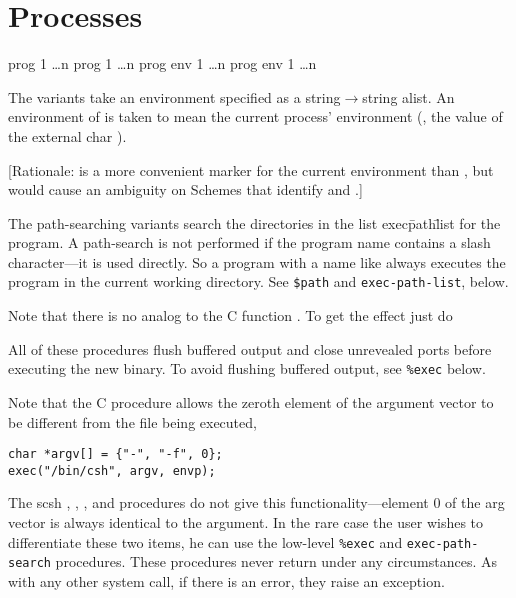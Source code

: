 \section{Processes}

 {prog 1 \ldots {}n} \noreturn
{} {prog 1 \ldots {}n} \noreturn
{}  {prog env 1 \ldots {}n} \noreturn
{} {prog env 1 \ldots {}n} \noreturn
\begin{desc}

The  variants take an environment specified as a 
string$\rightarrow$string alist.
An environment of {\sharpt} is taken to mean the current process' environment 
(\ie, the value of the external char ).

[Rationale: {\sharpf} is a more convenient marker for the current environment
 than {\sharpt}, but would cause an ambiguity on Schemes that identify 
 {\sharpf} and \ex{()}.]

The path-searching variants search the directories in the list 
{\ttt exec\=path\=list} for the program.
A path-search is not performed if the program name contains
a slash character---it is used directly. So a program with a name like
 always executes the program  in the current working
directory. See \verb|$path| and \verb|exec-path-list|, below.%

Note that there is no analog to the C function .
To get the effect just do

All of these procedures flush buffered output and close unrevealed ports
before executing the new binary.  
To avoid flushing buffered output, see \verb|%exec| below.

Note that the C  procedure allows the zeroth element of the
argument vector to be different from the file being executed, \eg
%
\begin{inset}
\begin{verbatim}
char *argv[] = {"-", "-f", 0};
exec("/bin/csh", argv, envp);\end{verbatim}
\end{inset}
%
The scsh , , , and 
procedures do not give this functionality---element 0 of the arg vector is
always identical to the  argument. In the rare case the user wishes
to differentiate these two items, he can use the low-level \verb|%exec| and
\verb|exec-path-search| procedures.
These procedures never return under any circumstances.
As with any other system call, if there is an error, they raise
an exception.
\end{desc}


